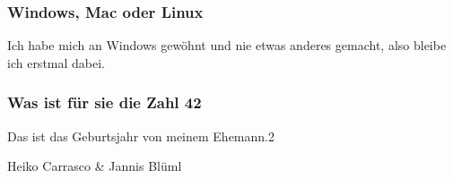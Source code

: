 {\subsubsection*{Windows, Mac oder Linux}
Ich habe mich an Windows gewöhnt und nie etwas anderes gemacht, also bleibe ich erstmal dabei.
\subsubsection*{Was ist für sie die Zahl 42}
Das ist das Geburtsjahr von meinem Ehemann.2

}{Heiko Carrasco \& Jannis Blüml}

\vfill
{}
